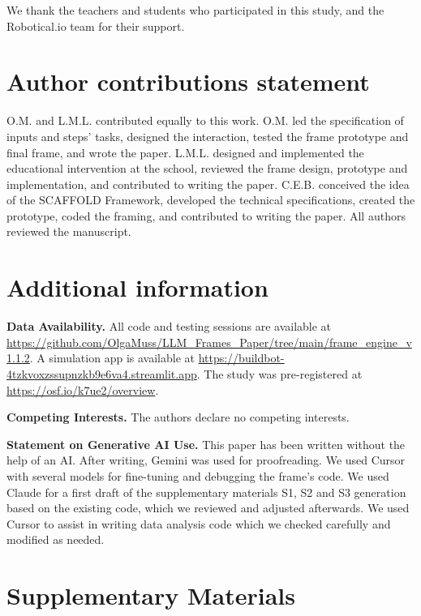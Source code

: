 \documentclass[fleqn,10pt]{wlscirep}
\begin{document}
We thank the teachers and students who participated in this study, and the Robotical.io team for their support.

\section*{Author contributions statement}

O.M. and L.M.L. contributed equally to this work. O.M. led the specification of inputs and steps' tasks, designed the interaction, tested the frame prototype and final frame, and wrote the paper. L.M.L. designed and implemented the educational intervention at the school, reviewed the frame design, prototype and implementation, and contributed to writing the paper. C.E.B. conceived the idea of the SCAFFOLD Framework, developed the technical specifications, created the prototype, coded the framing, and contributed to writing the paper. All authors reviewed the manuscript.

\section*{Additional information}

\noindent\textbf{Data Availability.} All code and testing sessions are available at \url{https://github.com/OlgaMuss/LLM_Frames_Paper/tree/main/frame_engine_v1.1.2}. A simulation app is available at \url{https://buildbot-4tzkvoxzssupnzkb9e6va4.streamlit.app}. The study was pre-registered at \url{https://osf.io/k7ue2/overview}.

\noindent\textbf{Competing Interests.} The authors declare no competing interests.

\noindent\textbf{Statement on Generative AI Use.} This paper has been written without the help of an AI. After writing, Gemini was used for proofreading. We used Cursor with several models for fine-tuning and debugging the frame's code. We used Claude for a first draft of the supplementary materials S1, S2 and S3 generation based on the existing code, which we reviewed and adjusted afterwards. We used Cursor to assist in writing data analysis code which we checked carefully and modified as needed.

\section*{Supplementary Materials}
\end{document}
